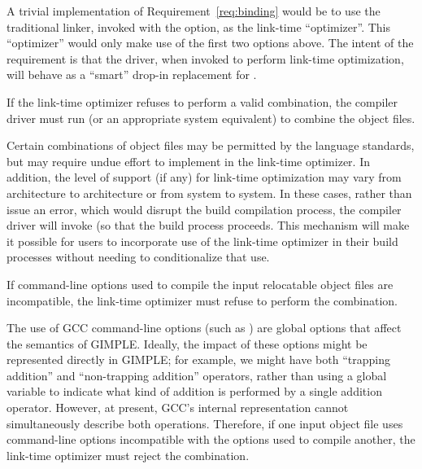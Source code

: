 \begin{note}
 A trivial implementation of Requirement~\ref{req:binding} would be to
 use the traditional linker, invoked with the  option, as the
 link-time ``optimizer''.  This ``optimizer'' would only make use of
 the first two options above.  The intent of the requirement is that
 the driver, when invoked to perform link-time optimization, will
 behave as a ``smart'' drop-in replacement for .
\end{note}

\begin{requirement}
 \label{req:optcomb}
 If the link-time optimizer refuses to perform a valid combination,
 the compiler driver must run  (or an appropriate
 system equivalent) to combine the object files.
\end{requirement}

\begin{rationale}
 Certain combinations of object files may be permitted by the language
 standards, but may require undue effort to implement in the link-time
 optimizer.  In addition, the level of support (if any) for link-time
 optimization may vary from architecture to architecture or from
 system to system.  In these cases, rather than issue an error, which
 would disrupt the build compilation process, the compiler driver will
 invoke  (so that the build process proceeds.  This
 mechanism will make it possible for users to incorporate use of the
 link-time optimizer in their build processes without needing to
 conditionalize that use.
\end{rationale}

\begin{requirement}
  If command-line options used to compile the input relocatable object
  files are incompatible, the link-time optimizer must refuse to
  perform the combination.
\end{requirement}

\begin{rationale}
  The use of GCC command-line options (such as ) are
  global options that affect the semantics of GIMPLE.  Ideally, the
  impact of these options might be represented directly in GIMPLE; for
  example, we might have both ``trapping addition'' and ``non-trapping
  addition'' operators, rather than using a global variable to
  indicate what kind of addition is performed by a single addition
  operator.  However, at present, GCC's internal representation cannot
  simultaneously describe both operations.  Therefore, if one input
  object file uses command-line options incompatible with the options
  used to compile another, the link-time optimizer must reject the
  combination.
\end{rationale}

